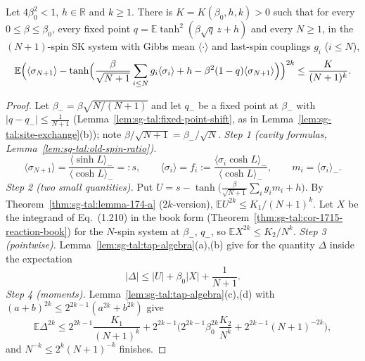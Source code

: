 \begin{theorem}
\label{thm:sg-tal:theorem-177}
  \leanok
{}
Let $4\beta_0^2<1$, $h\in\mathbb R$ and $k\ge1$.  There is $K=K(\beta_0,h,k)>0$ such that for every $0\le\beta\le\beta_0$, every fixed point $q=\mathbb E\tanh^2(\beta\sqrt q\,z+h)$ and every $N\ge1$, in the $(N+1)$-spin SK system with Gibbs mean $\langle\cdot\rangle$ and last-spin couplings $g_i$ ($i\le N$),
\[
\mathbb E\Bigl(\langle\sigma_{N+1}\rangle-\tanh\Bigl(\frac\beta{\sqrt{N+1}}\sum_{i\le N}g_i\langle\sigma_i\rangle+h-\beta^2(1-q)\langle\sigma_{N+1}\rangle\Bigr)\Bigr)^{2k}\le\frac K{(N+1)^k}.
\]
\end{theorem}
\begin{proof}
  \leanok
Let $\beta_-=\beta\sqrt{N/(N+1)}$ and let $q_-$ be a fixed point at $\beta_-$ with $|q-q_-|\le\frac1{N+1}$ (Lemma~\ref{lem:sg-tal:fixed-point-shift}, as in Lemma~\ref{lem:sg-tal:site-exchange}(b)); note $\beta/\sqrt{N+1}=\beta_-/\sqrt N$.
\emph{Step 1 (cavity formulas, Lemma~\ref{lem:sg-tal:old-spin-ratio}).}
\[
\langle\sigma_{N+1}\rangle=\frac{\langle\sinh L\rangle_-}{\langle\cosh L\rangle_-}=:s,\qquad\langle\sigma_i\rangle=f_i:=\frac{\langle\sigma_i\cosh L\rangle_-}{\langle\cosh L\rangle_-},\qquad m_i=\langle\sigma_i\rangle_- .
\]
\emph{Step 2 (two small quantities).} Put $U=s-\tanh\big(\frac\beta{\sqrt{N+1}}\sum_ig_im_i+h\big)$. By Theorem~\ref{thm:sg-tal:lemma-174-a} ($2k$-version), $\mathbb EU^{2k}\le K_1/(N+1)^k$. Let $X$ be the integrand of Eq.~(1.210) in the book form (Theorem~\ref{thm:sg-tal:cor-1715-reaction-book}) for the $N$-spin system at $\beta_-$, $q_-$, so $\mathbb EX^{2k}\le K_2/N^k$.
\emph{Step 3 (pointwise).} Lemma~\ref{lem:sg-tal:tap-algebra}(a),(b) give for the quantity $\Delta$ inside the expectation
\[
|\Delta|\le|U|+\beta_0|X|+\frac1{N+1}.
\]
\emph{Step 4 (moments).} Lemma~\ref{lem:sg-tal:tap-algebra}(c),(d) with $(a+b)^{2k}\le2^{2k-1}(a^{2k}+b^{2k})$ give
\[
\mathbb E\Delta^{2k}\le2^{2k-1}\frac{K_1}{(N+1)^k}+2^{2k-1}\Big(2^{2k-1}\beta_0^{2k}\frac{K_2}{N^k}+2^{2k-1}(N+1)^{-2k}\Big),
\]
and $N^{-k}\le2^k(N+1)^{-k}$ finishes.
\end{proof}

